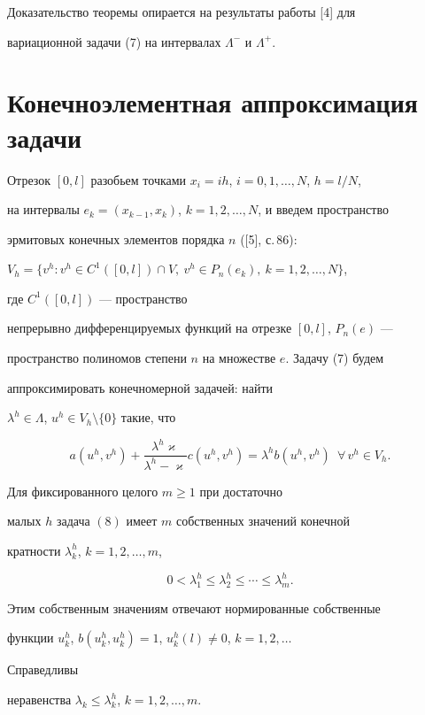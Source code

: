  


Доказательство теоремы опирается на результаты работы [4] для 


вариационной задачи (7) на интервалах $\Lambda^-$ и $\Lambda^+$.  


 


\section{Конечноэлементная аппроксимация задачи} 


 


Отрезок $[0,l]$ разобьем точками $x_i=ih$, $i=0,1,\dotsc,N$, $h=l/N$, 


на интервалы $e_k=(x_{k-1},x_k)$, $k=1,2,\dotsc,N$, и введем пространство  


эрмитовых конечных элементов порядка $n$ ([5], с.\,86): 


$V_h=\{v^h:v^h\in C^1([0,l])\cap V,\ v^h\in P_n(e_k),\ k=1,2,\dotsc,N\}$, 


где $C^1([0,l])$ --- пространство  


непрерывно дифференцируемых функций на отрезке $[0,l]$, $P_n(e)$ --- 


пространство полиномов степени $n$ на множестве $e$. Задачу (7) будем  


аппроксимировать конечномерной задачей: найти 


$\lambda^h\in\Lambda$, $u^h\in V_h\setminus\{0\}$ такие, что 


\begin{equation} 


a(u^h,v^h)+\frac{\lambda^h\varkappa}{\lambda^h-\varkappa} 


c(u^h,v^h)=\lambda^h b(u^h,v^h)\ \; \forall\,v^h\in V_h. 


\end{equation} 


 


\begin{thm} 


Для фиксированного целого $m\ge1$ при достаточно  


малых $h$ задача $(8)$ имеет $m$ собственных значений конечной  


кратности $\lambda^h_k$, $k=1,2,\dotsc,m$, 


$$ 


0<\lambda^h_1\le\lambda^h_2\le\dotsb\le\lambda^h_m. 


$$ 


Этим собственным значениям отвечают нормированные собственные  


функции $u^h_k$, $b(u^h_k,u^h_k){=}1$, $u^h_k(l)\ne0$, $k=1,2,\dotsc$ 


Справедливы  


неравенства $\lambda_k\le\lambda^h_k$, $k=1,2,\dotsc,m$. 


\end{thm} 


